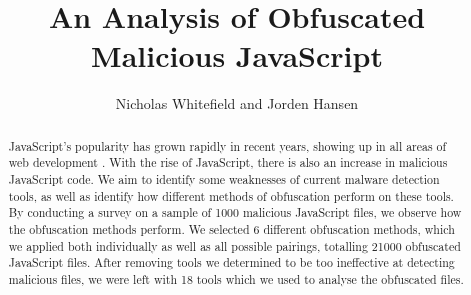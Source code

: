 \documentclass[sigplan,10pt,review, nonacm=true]{acmart}\settopmatter{printfolios=true,printccs=false,printacmref=false}
\begin{document}
\title[]{An Analysis of Obfuscated Malicious JavaScript}         %
\author{Nicholas Whitefield and Jorden Hansen}


\begin{abstract}
JavaScript's popularity has grown rapidly in recent years, showing up in all areas of web development \cite{JavascriptIsPopular}. With the rise of JavaScript, there is also an increase in malicious JavaScript code. We aim to identify some weaknesses of current malware detection tools, as well as identify how different methods of obfuscation perform on these tools. By conducting a survey on a sample of 1000 malicious JavaScript files, we observe how the obfuscation methods perform. We selected 6 different obfuscation methods, which we applied both individually as well as all possible pairings, totalling 21000 obfuscated JavaScript files. After removing tools we determined to be too ineffective at detecting malicious files, we were left with 18 tools which we used to analyse the obfuscated files.
\end{abstract}


\maketitle
\end{document}
